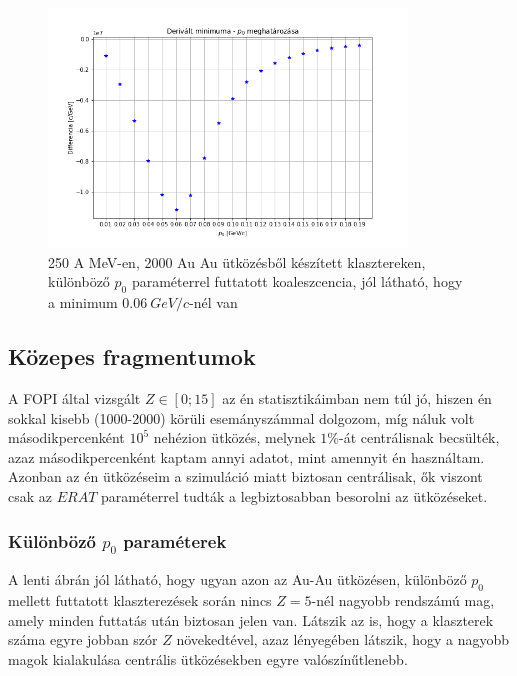 \documentclass[a4paper,12pt]{article}
\begin{document}
\vspace{5mm}

\begin{figure}[!htb]
\centering
\includegraphics[width=0.85\textwidth]{./legjobb_p0.png}
\caption{250 A MeV-en, 2000 Au Au ütközésből készített klasztereken, különböző $p_{0}$ paraméterrel futtatott koaleszcencia, jól látható, hogy a minimum $0.06 ~GeV/c$-nél van}
\end{figure}

\subsection{Közepes fragmentumok}

\vspace{5mm}

\par A FOPI által vizsgált $Z \in [0;15]$ az én statisztikáimban nem túl jó, hiszen én sokkal kisebb (1000-2000) körüli esemányszámmal dolgozom, míg náluk volt másodikpercenként $10^{5}$ nehézion ütközés, melynek $1\%$-át centrálisnak becsülték, azaz másodikpercenként kaptam annyi adatot, mint amennyit én használtam. Azonban az én ütközéseim a szimuláció miatt biztosan centrálisak, ők viszont csak az $ERAT$ paraméterrel tudták a legbiztosabban besorolni az ütközéseket.

\vspace{5mm}

\subsubsection{ Különböző $p_{0}$ paraméterek}

\vspace{5mm}

\par A lenti ábrán jól látható, hogy ugyan azon az Au-Au ütközésen, különböző $p_{0}$ mellett futtatott klaszterezések során nincs $Z = 5$-nél nagyobb rendszámú mag, amely minden futtatás után biztosan jelen van. Látszik az is, hogy a klaszterek száma egyre jobban szór $Z$ növekedtével, azaz lényegében látszik, hogy a nagyobb magok kialakulása centrális ütközésekben egyre valószínűtlenebb.
\end{document}
